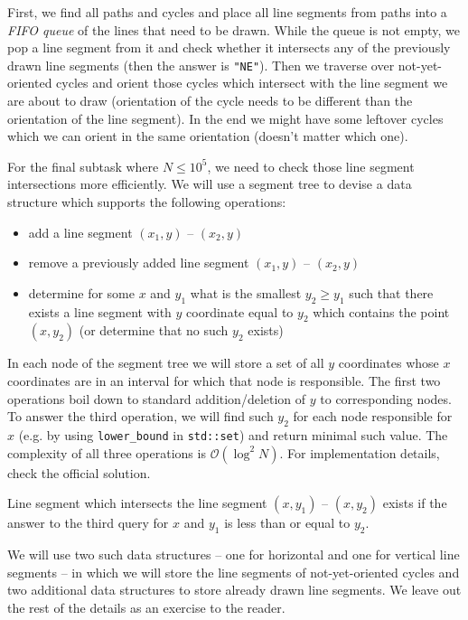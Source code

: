 \documentclass[a4paper]{article}
\begin{document}
First, we find all paths and cycles and place all line segments from paths into
a \textit{FIFO queue} of the lines that need to be drawn. While the queue is not
empty, we pop a line segment from it and check whether it intersects any of the
previously drawn line segments (then the answer is \texttt{"NE"}). Then we
traverse over not-yet-oriented cycles and orient those cycles which intersect
with the line segment we are about to draw (orientation of the cycle needs to
be different than the orientation of the line segment). In the end we might have
some leftover cycles which we can orient in the same orientation (doesn't matter
which one).

For the final subtask where $N \le 10^5$, we need to check those line segment
intersections more efficiently. We will use a segment tree to devise a data
structure which supports the following operations:

\begin{itemize}
  \item add a line segment $(x_1, y)$ -- $(x_2, y)$
  \item remove a previously added line segment $(x_1, y)$ -- $(x_2, y)$ 
  \item determine for some $x$ and $y_1$ what is the smallest $y_2 \ge y_1$ such that
    there exists a line segment with $y$ coordinate equal to $y_2$ which contains
    the point $(x, y_2)$ (or determine that no such $y_2$ exists)
\end{itemize}

In each node of the segment tree we will store a set of all $y$ coordinates
whose $x$ coordinates are in an interval for which that node is responsible.
The first two operations boil down to standard addition/deletion of $y$ to
corresponding nodes. To answer the third operation, we will find such $y_2$ for
each node responsible for $x$ (e.g. by using \texttt{lower\_bound} in \texttt{std::set}) and
return minimal such value. The complexity of all three operations is
$\mathcal{O}(\log^2 N)$. For implementation details, check the official solution.

Line segment which intersects the line segment $(x, y_1)$ -- $(x, y_2)$ exists if
the answer to the third query for $x$ and $y_1$ is less than or equal to $y_2$.

We will use two such data structures -- one for horizontal and one for vertical
line segments -- in which we will store the line segments of not-yet-oriented
cycles and two additional data structures to store already drawn line segments.
We leave out the rest of the details as an exercise to the reader.
\end{document}
